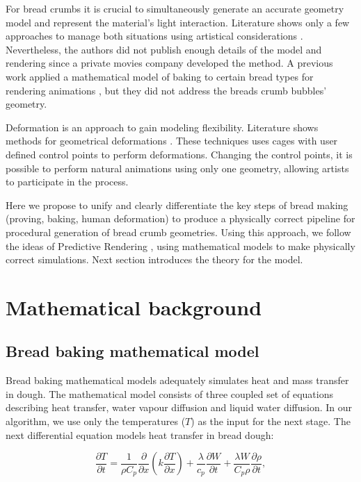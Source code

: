 \documentclass[final,5p,times]{elsarticle}
\begin{document}
For bread crumbs it is crucial to simultaneously generate an accurate geometry model and represent the material's light interaction. Literature shows only a few approaches to manage both situations using artistical considerations \cite{Cho2007}. Nevertheless, the authors did not publish enough details of the model and rendering since a private movies company developed the method. A previous work applied a mathematical model of baking to certain bread types for rendering animations \cite{Rodriguez-Arenas2011}, but they did not address the breads crumb bubbles' geometry.

Deformation is an approach to gain modeling flexibility. Literature shows methods for geometrical deformations \cite{Lipman2008,Floater2003}. These techniques uses cages with user defined control points to perform deformations. Changing the control points, it is possible to perform natural animations using only one geometry, allowing artists to participate in the process.

Here we propose to unify and clearly differentiate the key steps of bread making (proving, baking, human deformation) to produce a physically correct pipeline for procedural generation of bread crumb geometries. Using this approach, we follow the ideas of Predictive Rendering \cite{Wilkie2009}, using mathematical models to make physically correct simulations. Next section introduces the theory for the model.

\section{Mathematical background}

\subsection{Bread baking mathematical model}
Bread baking mathematical models adequately simulates heat and mass transfer in dough. The mathematical model consists of three coupled set of equations describing heat transfer, water vapour diffusion and liquid water diffusion. In our algorithm,  we use only the temperatures ($T$) as the input for the next stage. The next differential equation models heat transfer in bread dough:

\begin{equation}
\frac{\partial T}{\partial t} = \frac{1}{\rho C_{p}} \frac{\partial}{\partial x} \left ( k \frac{\partial T}{\partial x} \right ) + \frac{\lambda}{c_{p}} \frac{\partial W}{\partial t}+\frac{\lambda W}{ C_{p} \rho}\frac{\partial \rho}{\partial t},
\end{equation}
\end{document}
